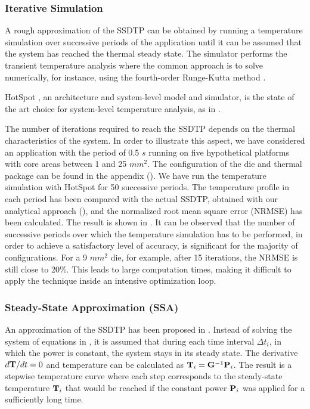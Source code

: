 \subsubsection{Iterative Simulation}

A rough approximation of the SSDTP can be obtained by running a temperature
simulation over successive periods of the application until it can be assumed
that the system has reached the thermal steady state. The simulator performs the
transient temperature analysis where the common approach is to solve
 numerically, for instance, using the
fourth-order Runge-Kutta method \cite{press2007}.

HotSpot \cite{skadron2003}, an architecture and system-level model and
simulator, is the state of the art choice for system-level temperature analysis,
as in \cite{srinivasan2004, liao2005, coskun2006, liu2007, huang2009, xiang2010,
thiele2011}.

The number of iterations required to reach the SSDTP depends on the thermal
characteristics of the system. In order to illustrate this aspect, we have
considered an application with the period of 0.5 $s$ running on five
hypothetical platforms with core areas between 1 and 25 $mm^2$. The
configuration of the die and thermal package can be found in the appendix
(). We have run the temperature simulation with HotSpot
\cite{skadron2003} for 50 successive periods. The temperature profile in each
period has been compared with the actual SSDTP, obtained with our analytical
approach (), and the normalized root mean square error
(NRMSE) has been calculated. The result is shown in . It can
be observed that the number of successive periods over which the temperature
simulation has to be performed, in order to achieve a satisfactory level of
accuracy, is significant for the majority of configurations. For a 9 $mm^2$ die,
for example, after 15 iterations, the NRMSE is still close to 20\%. This leads
to large computation times, making it difficult to apply the technique inside an
intensive optimization loop.

\subsubsection{Steady-State Approximation (SSA)}

An approximation of the SSDTP has been proposed in \cite{huang2009}. Instead of
solving the system of equations in , it is
assumed that during each time interval $\Delta t_i$, in which the power is
constant, the system stays in its steady state. The derivative $d\mathbf{T}/dt = 0$
and temperature can be calculated as $\mathbf{T}_i = \mathbf{G}^{-1} \mathbf{P}_i$. The result
is a stepwise temperature curve where each step corresponds to the steady-state
temperature $\mathbf{T}_i$ that would be reached if the constant power $\mathbf{P}_i$ was
applied for a sufficiently long time.

